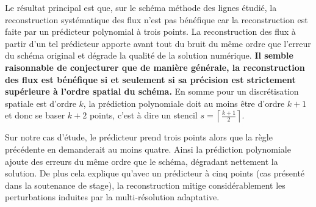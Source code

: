 Le résultat principal est que, sur le schéma méthode des lignes étudié, la reconstruction systématique des flux n'est pas bénéfique 
car la reconstruction est faite par un
prédicteur polynomial à trois points. La reconstruction des flux à partir d'un tel prédicteur apporte avant tout du bruit du même ordre que l'erreur du schéma original et dégrade la qualité de la solution numérique.
\textbf{
    Il semble raisonnable de conjecturer que de manière générale,
    la reconstruction des flux est bénéfique si et seulement si 
    sa précision est strictement supérieure à l'ordre spatial du schéma.}
En somme pour un discrétisation spatiale est d'ordre $k$, la prédiction polynomiale doit au moins être d'ordre $k+1$ et donc se baser $k+2$ points, 
c'est à dire un stencil $s = \left\lceil{\frac{k+1}{2}}\right\rceil$.\par 
Sur notre cas d'étude, le prédicteur prend trois points alors que la règle précédente en demanderait au moins quatre.
Ainsi la prédiction polynomiale ajoute des erreurs du même ordre que le schéma, dégradant nettement la solution.
De plus cela explique qu'avec un prédicteur à cinq points (cas présenté dans la soutenance de stage),
la reconstruction mitige considérablement les perturbations induites par la multi-résolution adaptative.